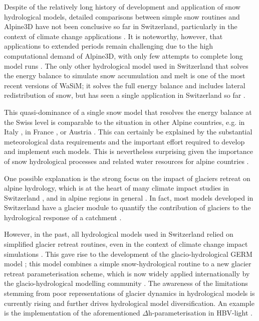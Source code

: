 \documentclass[10pt,a4paper]{article}
\begin{document}
Despite of the relatively long history of development and application of snow hydrological models, detailed comparisons between simple snow routines and Alpine3D have not been conclusive so far in Switzerland, particularly in the context of climate change applications \citep{Kobierska2011, Shakoor2018}. It is noteworthy, however, that applications to extended periods remain challenging due to the high computational demand of Alpine3D, with only few attempts to complete long model runs \citep{Michel2021}. The only other hydrological model used in Switzerland that solves the energy balance to simulate snow accumulation and melt is one of the most recent versions of WaSiM; it solves the full energy balance and includes lateral redistribution of snow, but has seen a single application in Switzerland so far \citep{Thornton2021}. 

This quasi-dominance of a single snow model that resolves the energy balance at the Swiss level is comparable to the situation in other Alpine countries, e.g. in Italy \citep[Geotop;][]{Endrizzi2014}, in France \citep[Crocus;][]{Vionnet2012}, or Austria \citep[Admunsen;][]{Strasser2004}. This can certainly be explained by the substantial meteorological data requirements and the important effort required to develop and implement such models. This is nevertheless surprising given the importance of snow hydrological processes and related water resources for alpine countries \citep{Beniston2018}.

One possible explanation is the strong focus on the impact of glaciers retreat on alpine hydrology, which is at the heart of many climate impact studies in Switzerland \citep{Horton2006, Schaefli2007b, Junghans2011, Addor2014, Finger2015, Etter2017}, and in alpine regions in general \citep{Huss2017}. In fact, most models developed in Switzerland have a glacier module to quantify the contribution of glaciers to the hydrological response of a catchment \citep[see for example][]{Finger2011, Verbunt2003, Zappa2007a, Uhlmann2013a}. 
 
However, in the past, all hydrological models used in Switzerland relied on simplified glacier retreat routines, even in the context of climate change impact simulations \citep[e.g.][]{Horton2006}. 
This gave rise to the development of the glacio-hydrological GERM model \citep{Huss2016, Junghans2011, Farinotti2012, Finger2013}; this model combines a simple snow-hydrological routine to a new glacier retreat parameterisation scheme, which is now widely applied internationally by the glacio-hydrological modelling community \citep[][called $\Delta$h-parametrisation]{Huss2010}. The awareness of the limitations stemming from poor representations of glacier dynamics in hydrological models is currently rising and further drives hydrological model diversification. An example is the implementation of the aforementioned $\Delta$h-parameterisation in HBV-light \citep{Seibert2018}. 
\end{document}
